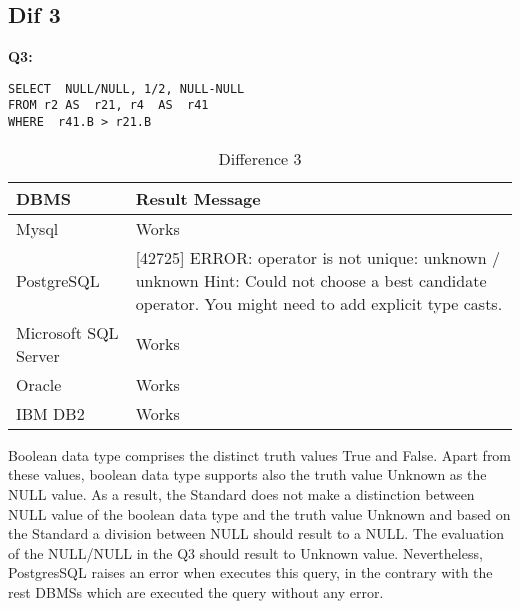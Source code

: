 \hfill\newpage
\subsection{Dif 3}

\textbf{Q3:}
\begin{mdframed}[backgroundcolor=lightgray!20]
\begin{lstlisting}[style=SQL]
SELECT  NULL/NULL, 1/2, NULL-NULL
FROM r2 AS  r21, r4  AS  r41
WHERE  r41.B > r21.B 
\end{lstlisting}
\end{mdframed}

\begin{table}[h]
\centering
\caption{Difference 3}
\label{my-label}
\begin{tabular}{|p{2cm}|p{11.5cm}| }
\hline
\textbf{DBMS} & \textbf{Result Message}                                                                                                                                   \\ \hline
Mysql         & Works                                                                                                                                                     \\ \hline
PostgreSQL    & {[}42725{]} ERROR: operator is not unique: unknown / unknown Hint: Could not choose a best candidate operator. You might need to add explicit type casts. \\ \hline
Microsoft SQL Server     & Works                                                                                                                                                     \\ \hline
Oracle        & Works                                                                                                                                                     \\ \hline
IBM DB2       & Works                                                                                                                                                     \\ \hline
\end{tabular}
\end{table}

Boolean data type comprises the distinct truth values True and False. Apart from these values, boolean data type supports also the truth value Unknown as the NULL value. As a result, the Standard does not make a distinction between NULL value of the boolean data type and the truth value Unknown and based on the Standard a division between NULL should result to a NULL. The evaluation of the NULL/NULL in the Q3 should result to Unknown value. Nevertheless, PostgresSQL raises an error when executes this query, in the contrary with the rest DBMSs which are executed the query without any error. 


